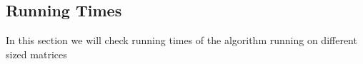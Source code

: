 \subsection*{Running Times}
In this section we will check running times of the algorithm running on different sized matrices


